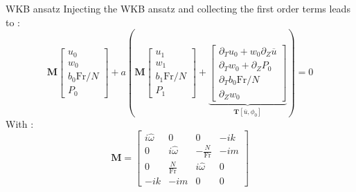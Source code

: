 \documentclass[10pt]{beamer}
\begin{document}
\begin{frame}[fragile]{WKB ansatz}
	Injecting the WKB ansatz and collecting the first order terms leads to :
  	\begin{equation*}\!\!\!\!\!\!\!\!\!\!
  		\mathbf{M}
  		\begin{bmatrix}
  			u_{0}\\
  			w_{0}\\
  			b_{0}\mathrm{Fr}/N\\
  			P_{0}
  		\end{bmatrix}
  		+a\left(\mathbf{M}
  		\begin{bmatrix}
  			u_{1}\\
  			w_{1}\\
  			b_{1}\mathrm{Fr}/N\\
  			P_{1}
  		\end{bmatrix}+
  		\underbrace{\begin{bmatrix}
  			\partial_{T}u_{0}+w_{0}\partial_{Z}\overline{u} \\
  			\partial_{T}w_{0}+\partial_{Z}P_{0}\\
  			\partial_{T}b_{0}\mathrm{Fr}/N\\
  			\partial_{Z}w_{0}
  		\end{bmatrix}}_{\boldsymbol{T}\left[\overline{u},\phi_{0}\right]}
  	 	\right) =0
  	\end{equation*}
  With : 
  \begin{equation*}
  	\mathbf{M} =
  	\begin{bmatrix}
  		i\hat{\omega} 	&  0  &  0 & -ik  \\
  		0	& i\hat{\omega}  & -\frac{N}{\mathrm{Fr}} & -im\\
  		0   &  \frac{N}{\mathrm{Fr}}  &  i\hat{\omega} & 0\\
  		-ik  &  -im  &  0  &  0
  	\end{bmatrix}
  \end{equation*}
\end{frame}
\end{document}
